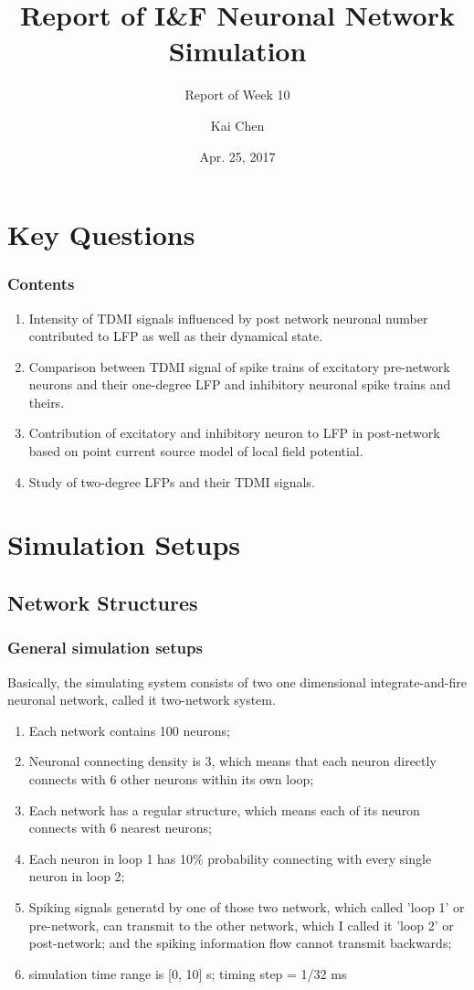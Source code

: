\documentclass{beamer}
\title{Report of I\&F Neuronal Network Simulation}
\subtitle{Report of Week 10}
\author{Kai Chen}
\date{Apr. 25, 2017}
\begin{document}
	\frame{\titlepage}
	\section{Key Questions}
	\begin{frame}
		\frametitle{Contents}
		\begin{enumerate}[*]
			\item Intensity of TDMI signals influenced by post network neuronal number contributed to LFP as well as their dynamical state.
			\item Comparison between TDMI signal of spike trains of excitatory pre-network neurons and their one-degree LFP and inhibitory neuronal spike trains and theirs. 
			\item Contribution of excitatory and inhibitory neuron to LFP in post-network based on point current source model of local field potential.
			\item Study of two-degree LFPs and their TDMI signals.
		\end{enumerate}
	\end{frame}
	\section{Simulation Setups}
	\subsection{Network Structures}
	\begin{frame}
		\frametitle{General simulation setups}
		Basically, the simulating system consists of two one dimensional integrate-and-fire neuronal network, called it two-network system. 
		\begin{enumerate}
			\scriptsize
			\item Each network contains 100 neurons;
			\item Neuronal connecting density is 3, which means that each neuron directly connects with 6 other neurons within its own loop;
			\item Each network has a regular structure, which means each of its neuron connects with 6 nearest neurons;
			\item Each neuron in loop 1 has 10\% probability connecting with every single neuron in loop 2;
			\item Spiking signals generatd by one of those two network, which called 'loop 1' or pre-network, can transmit to the other network, which I called it 'loop 2' or post-network; and the spiking information flow cannot transmit backwards;
			\item simulation time range is [0, 10] s; timing step = 1/32 ms
		\end{enumerate}		
	\end{frame}
\end{document}
